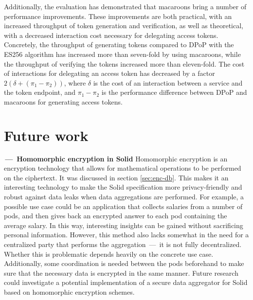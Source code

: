 Additionally, the evaluation has demonstrated that macaroons bring a number of performance improvements. These improvements are both practical, with an increased throughput of token generation and verification, as well as theoretical, with a decreased interaction cost necessary for delegating access tokens. Concretely, the throughput of generating tokens compared to \gls{DPoP} with the ES256 algorithm has increased more than seven-fold by using macaroons, while the throughput of verifying the tokens increased more than eleven-fold. The cost of interactions for delegating an access token has decreased by a factor $2(\delta + (\pi_1 - \pi_2))$, where $\delta$ is the cost of an interaction between a service and the token endpoint, and $\pi_1 - \pi_2$ is the performance difference between \gls{DPoP} and macaroons for generating access tokens.


\section{Future work}
\label{sec:future-work}
\begin{futurework}\label{fw:homomorphic-encryption}
\textbf{\,---\, Homomorphic encryption in Solid} Homomorphic encryption is an encryption technology that allows for mathematical operations to be performed on the ciphertext. It was discussed in section \ref{sec:enc-db}. This makes it an interesting technology to make the Solid specification more privacy-friendly and robust against data leaks when data aggregations are performed. For example, a possible use case could be an application that collects salaries from a number of pods, and then gives back an encrypted answer to each pod containing the average salary. In this way, interesting insights can be gained without sacrificing personal information. However, this method also lacks somewhat in the need for a centralized party that performs the aggregation \,---\, it is not fully decentralized. Whether this is problematic depends heavily on the concrete use case. Additionally, some coordination is needed between the pods beforehand to make sure that the necessary data is encrypted in the same manner. Future research could investigate a potential implementation of a secure data aggregator for Solid based on homomorphic encryption schemes.
\end{futurework}

